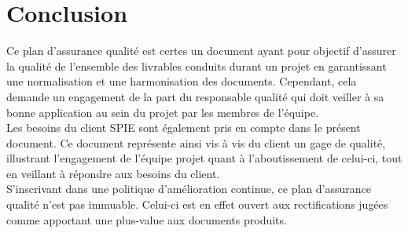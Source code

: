
\section{Conclusion}

Ce plan d’assurance qualité est certes un document ayant pour objectif d’assurer la qualité de l’ensemble des livrables conduits durant un projet en garantissant une normalisation et une harmonisation des documents. Cependant, cela demande un engagement de la part du responsable qualité qui doit veiller à sa bonne application au sein du projet par les membres de l’équipe. \\

Les besoins du client SPIE sont également pris en compte dans le présent document. Ce document représente ainsi vis à vis du client un gage de qualité, illustrant l’engagement de l’équipe projet quant à l’aboutissement de celui-ci, tout en veillant à répondre aux besoins du client.  \\

S’inscrivant dans une politique d’amélioration continue, ce plan d’assurance qualité n’est pas immuable. Celui-ci est en effet ouvert aux rectifications jugées comme apportant une plus-value aux documents produits.